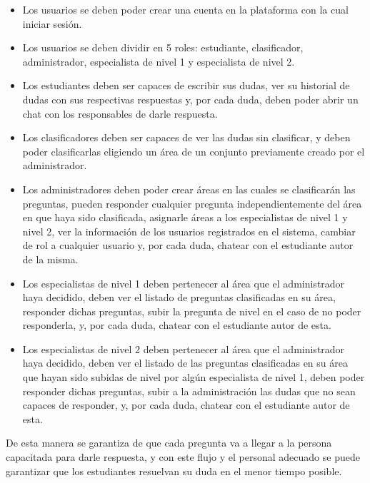 \begin{itemize}
	\item Los usuarios se deben poder crear una cuenta en la plataforma con la cual iniciar sesión.
	
	\item Los usuarios se deben dividir en 5 roles: estudiante, clasificador, administrador, especialista de nivel 1 y especialista de nivel 2.
	
	\item Los estudiantes deben ser capaces de escribir sus dudas, ver su historial de dudas con sus respectivas respuestas y, por cada duda, deben poder abrir un chat con los responsables de darle respuesta.
	
	\item Los clasificadores deben ser capaces de ver las dudas sin clasificar, y deben poder clasificarlas eligiendo un área de un conjunto previamente creado por el administrador.
	
	\item Los administradores deben poder crear áreas en las cuales se clasificarán las preguntas, pueden responder cualquier pregunta independientemente del área en que haya sido clasificada, asignarle áreas a los especialistas de nivel 1 y nivel 2, ver la información de los usuarios registrados en el sistema, cambiar de rol a cualquier usuario y, por cada duda, chatear con el estudiante autor de la misma.
	
	\item Los especialistas de nivel 1 deben pertenecer al área que el administrador haya decidido, deben ver el listado de preguntas clasificadas en su área, responder dichas preguntas, subir la pregunta de nivel en el caso de no poder responderla, y, por cada duda, chatear con el estudiante autor de esta.
	
	\item Los especialistas de nivel 2 deben pertenecer al área que el administrador haya decidido, deben ver el listado de las preguntas clasificadas en su área que hayan sido subidas de nivel por algún especialista de nivel 1, deben poder responder dichas preguntas, subir a la administración las dudas que no sean capaces de responder, y, por cada duda, chatear con el estudiante autor de esta.
\end{itemize}

De esta manera se garantiza de que cada pregunta va a llegar a la persona capacitada para darle respuesta, y con este flujo y el personal adecuado se puede garantizar que los estudiantes resuelvan su duda en el menor tiempo posible.